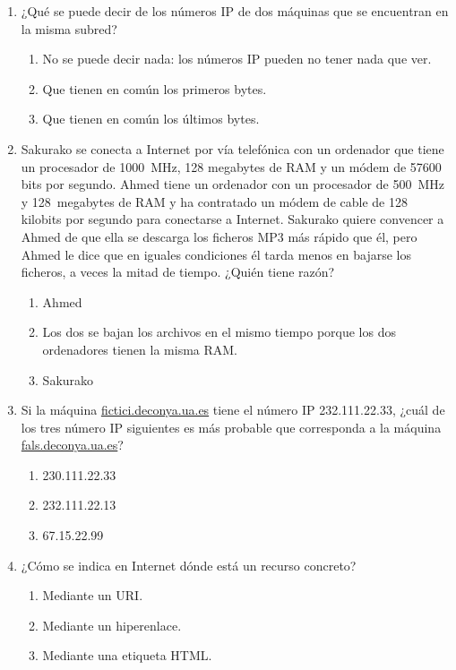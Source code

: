 \begin{enumerate}
\item ¿Qué se puede decir de los números IP de dos máquinas que se encuentran en la misma subred? \begin{enumerate} \item No se  puede decir nada: los números IP pueden no tener nada que ver. \item Que tienen en común los primeros bytes. \item Que tienen en común los últimos bytes. \end{enumerate} 

\item Sakurako se conecta a Internet por vía telefónica con un ordenador que tiene un procesador de 1000~MHz, 128 megabytes de RAM y un módem de 57600 bits por segundo. Ahmed tiene un ordenador con un procesador de 500~MHz y 128~megabytes de RAM y ha contratado un módem de cable de 128 kilobits por segundo para conectarse a Internet. Sakurako quiere convencer a Ahmed de que ella se descarga los ficheros MP3 más rápido que él, pero Ahmed le dice que en iguales condiciones él tarda menos en bajarse los ficheros, a veces la mitad de tiempo. ¿Quién tiene razón? \begin{enumerate} \item Ahmed \item Los dos se bajan los archivos en el mismo tiempo porque los dos ordenadores tienen la misma RAM. \item Sakurako \end{enumerate} 

\item Si la máquina \url{fictici.deconya.ua.es} tiene el número IP 232.111.22.33, ¿cuál de los tres número IP siguientes es más probable que corresponda a la máquina \url{fals.deconya.ua.es}? \begin{enumerate} \item 230.111.22.33 \item 232.111.22.13 \item 67.15.22.99 \end{enumerate} 

\item ¿Cómo se indica en Internet dónde está un recurso concreto? \begin{enumerate} \item Mediante un URI. \item Mediante un hiperenlace. \item Mediante una etiqueta HTML. \end{enumerate} 


\end{enumerate}
